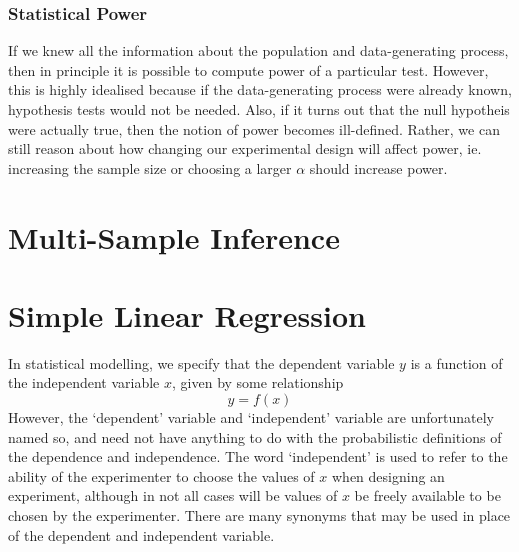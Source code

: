 \documentclass[11pt]{report} %
\begin{document}
\subsubsection{Statistical Power}

If we knew all the information about the population and data-generating process, then in principle it is possible to compute power of a particular test. However, this is highly idealised because if the data-generating process were already known, hypothesis tests would not be needed. Also, if it turns out that the null hypotheis were actually true, then the notion of power becomes ill-defined. Rather, we can still reason about how changing our experimental design will affect power, ie. increasing the sample size or choosing a larger $\alpha$ should increase power.

\section{Multi-Sample Inference}

\section{Simple Linear Regression}

In statistical modelling, we specify that the dependent variable $y$ is a function of the independent variable $x$, given by some relationship
\begin{equation}
y = f\left(x\right)
\end{equation}
However, the `dependent' variable and `independent' variable are unfortunately named so, and need not have anything to do with the probabilistic definitions of the dependence and independence. The word `independent' is used to refer to the ability of the experimenter to choose the values of $x$ when designing an experiment, although in not all cases will be values of $x$ be freely available to be chosen by the experimenter. There are many synonyms that may be used in place of the dependent and independent variable.
\end{document}
